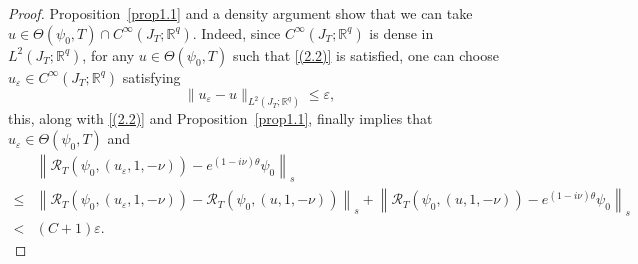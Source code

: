 \documentclass[10pt,a4paper]{amsart}
\def \leq{\leqslant}
\begin{document}
\begin{proof}
Proposition~\ref{prop1.1} and a density argument show that we can take $u \in \Theta\left(\psi_0, T\right) \cap C^{\infty}\left(J_T ; \mathbb{R}^q\right)$. Indeed, since $C^{\infty}\left(J_T ; \mathbb{R}^q\right)$ is dense in $L^2\left(J_T ; \mathbb{R}^q\right)$, for any $u\in  \Theta\left(\psi_0, T\right) $ such that  \eqref{(2.2)} is satisfied, one can choose $u_\varepsilon\in C^{\infty}\left(J_T ; \mathbb{R}^q\right)$ satisfying
\begin{equation*}
	\|u_\varepsilon - u\|_{L^2\left(J_T ; \mathbb{R}^q\right)}\leq \varepsilon,
\end{equation*}
this, along with \eqref{(2.2)} and  Proposition~\ref{prop1.1}, finally implies that $u_\varepsilon\in  \Theta\left(\psi_0, T\right) $ and
\begin{equation*}
	\begin{aligned}
	&\left\|\mathcal{R}_T\left(\psi_0, (u_\varepsilon,1,-\nu)\right)-e^{(1-i\nu) \theta} \psi_0\right\|_s \\
	\leq 	&\left\|\mathcal{R}_T\left(\psi_0, (u_\varepsilon,1,-\nu)\right)- \mathcal{R}_T\left(\psi_0, (u,1,-\nu)\right)\right\|_s + \left\|\mathcal{R}_T\left(\psi_0, (u,1,-\nu)\right)-e^{(1-i\nu) \theta} \psi_0\right\|_s\\
	< &( C+1 )\varepsilon.
	\end{aligned}
\end{equation*}
\end{proof}
\end{document}
